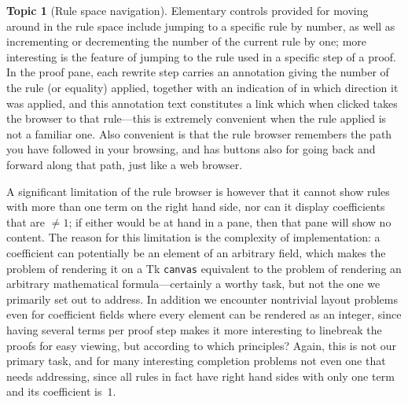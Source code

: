 \documentclass{article}
\theoremstyle{definition}
\newtheorem{topic}{Topic}
\begin{document}
\begin{topic}[Rule space navigation]
  Elementary controls provided for moving around in the rule space 
  include jumping to a specific rule by number, as well as 
  incrementing or decrementing the number of the current rule by one; 
  more interesting is the feature of jumping to the rule used in a 
  specific step of a proof. In the proof pane, each rewrite step 
  carries an annotation giving the number of the rule (or equality) 
  applied, together with an indication of in which direction it was 
  applied, and this annotation text constitutes a link which when 
  clicked takes the browser to that rule---this is extremely 
  convenient when the rule applied is not a familiar one. Also 
  convenient is that the rule browser remembers the path you have 
  followed in your browsing, and has buttons also for going back and 
  forward along that path, just like a web browser.
\end{topic}

A significant limitation of the rule browser is however that it 
cannot show rules with more than one term on the right hand side, nor 
can it display coefficients that are $\neq 1$; if either would be at 
hand in a pane, then that pane will show no content. The reason for 
this limitation is the complexity of implementation: a coefficient can 
potentially be an element of an arbitrary field, which makes the 
problem of rendering it on a Tk \texttt{canvas} equivalent to the 
problem of rendering an arbitrary mathematical formula---certainly a 
worthy task, but not the one we primarily set out to address. In 
addition we encounter nontrivial layout problems even for coefficient 
fields where every element can be rendered as an integer, since 
having several terms per proof step makes it more interesting to 
linebreak the proofs for easy viewing, but according to which 
principles? Again, this is not our primary task, and for many 
interesting completion problems not even one that needs addressing, 
since all rules in fact have right hand sides with only one term and 
its coefficient is~$1$.
\end{document}

